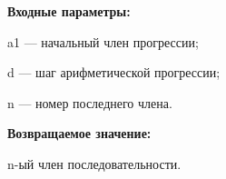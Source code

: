 \textbf{Входные параметры:}  
 
a1 --- начальный член прогрессии;
 
d --- шаг арифметической прогрессии;
 
n --- номер последнего члена.

\textbf{Возвращаемое значение:}
 
n-ый член последовательности.